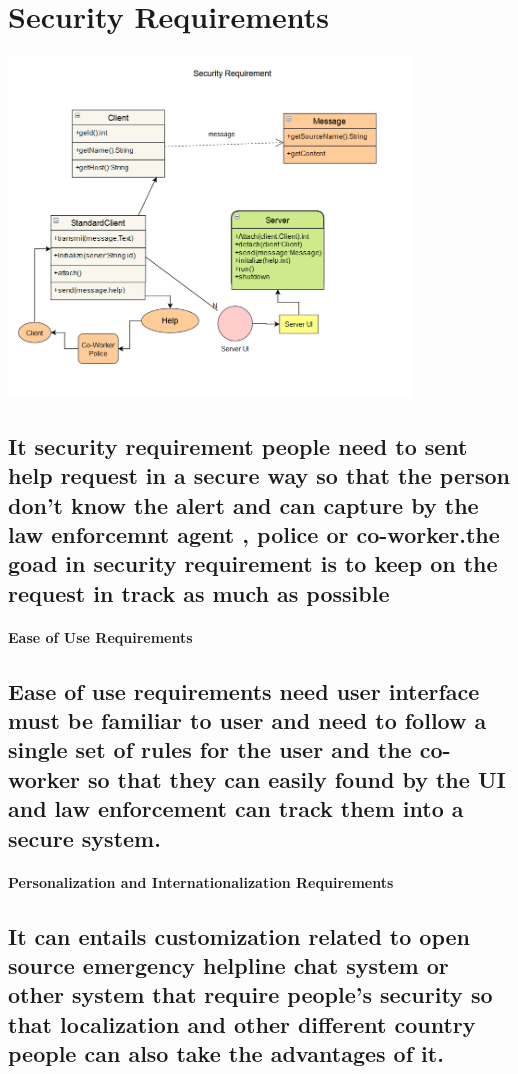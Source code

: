 \documentclass{article}
\begin{document}
\newpage

\section{Security Requirements}
\includegraphics[width=0.8\textwidth]{Security_Requirement.png}
\subsection{It security requirement people need to sent help request in a secure way so that the person don't know the alert and can capture by the law enforcemnt agent , police or co-worker.the goad in security requirement is to keep on the request in track as much as possible}




\paragraph{Ease of Use Requirements}
\subsection{Ease of use requirements need user interface must be familiar to user and need  to follow a single set of rules for the user and the co-worker 
so that they can easily  found by the UI and law enforcement can track them into a secure system.}


\paragraph{Personalization and Internationalization Requirements}
\subsection{It can entails customization related to open source emergency helpline chat system or other system that require people's security so that localization and other different country people can also take the advantages of it.}
\end{document}
